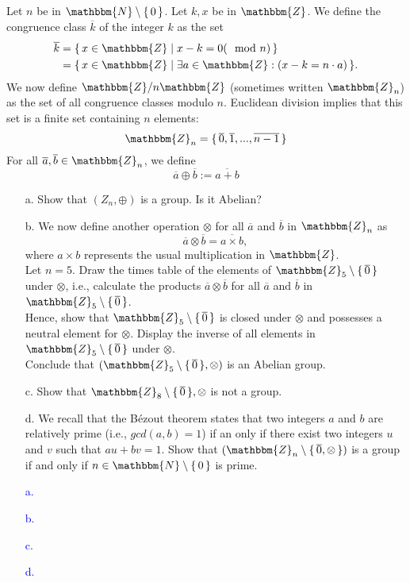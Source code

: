 \documentclass[a4paper,12pt]{article}
\newcommand{\Br}[1]{\{\, #1 \,\}}
\newcommand{\Z}{\mathbbm{Z}}
\newcommand{\N}{\mathbbm{N}}
\begin{document}
\subsection{}
Let $n$ be in $\N \setminus \Br{0}$. Let $k,x$ be in $\Z$. We define the congruence class $\overline{k}$ of the integer $k$ as the set
\begin{align*}
\overline{k} &= \Br{ x \in \Z \mid x-k=0 (\mod n) } \vspace{1mm}\\
&= \Br{ x \in \Z \mid \exists a \in \Z: (x-k = n \cdot a) }.
\end{align*}
We now define $\Z / n\Z$ (sometimes written $\Z_n$) as the set of all congruence classes modulo $n$. Euclidean division implies that this set is a finite set containing $n$ elements:
$$\Z_n = \Br{\overline{0}, \overline{1},...,\overline{n-1}}$$
For all $\overline{a}, \overline{b} \in \Z_n$, we define
$$\overline{a} \oplus \overline{b} := \overline{a+b}$$
\begin{itemize}
 \item [a.] Show that $(Z_n,\oplus)$ is a group. Is it Abelian?
 \item [b.] We now define another operation $\otimes$ for all $\overline{a}$ and $\overline{b}$ in $\Z_n$ as
 $$\overline{a} \otimes \overline{b} = \overline{a \times b},$$
 where $a \times b$ represents the usual multiplication in $\Z$.\\
 Let $n=5$. Draw the times table of the elements of $\Z_5 \setminus \Br{\overline{0}}$ under $\otimes$, i.e., calculate the products $\overline{a} \otimes \overline{b}$ for all $\overline{a}$ and $\overline{b}$ in $\Z_5 \setminus \Br{\overline{0}}$.\\
 Hence, show that $\Z_5 \setminus \Br{\overline{0}}$ is closed under $\otimes$ and possesses a neutral element for $\otimes$.
 Display the inverse of all elements in $\Z_5 \setminus \Br{\overline{0}}$ under $\otimes$.\\
 Conclude that $(\Z_5 \setminus \Br{\overline{0}}, \otimes)$ is an Abelian group.
 \item [c.] Show that $\Z_8 \setminus \Br{\overline{0}}, \otimes$ is not a group.
 \item [d.] We recall that the Bézout theorem states that two integers $a$ and $b$ are relatively prime (i.e., $gcd(a,b)=1$) if an only if there exist two integers $u$ and $v$ such that $au+bv=1$. Show that $(\Z_n \setminus \Br{\overline{0}, \otimes})$ is a group if and only if $n \in \N \setminus \Br{0}$ is prime.
\end{itemize}
\textcolor{blue}{
\begin{itemize}
 \item [a.]
 \item [b.]
 \item [c.]
 \item [d.]
\end{itemize}
}
\end{document}
